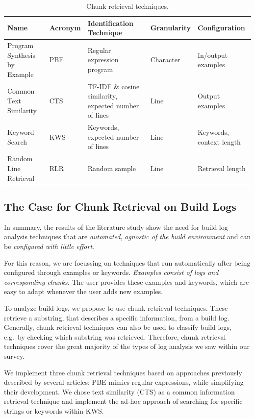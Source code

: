 \begin{table}[htb]
\centering
\caption{Chunk retrieval techniques.}
\begin{tabularx}{\textwidth}{@{}llXll@{}}
\toprule
Name			     & Acronym & Identification Technique
& Granularity & Configuration \\
\midrule
Program Synthesis by Example & PBE     & Regular expression program
& Character   & In/output examples	\\
Common Text Similarity	     & CTS     & TF-IDF \& cosine similarity,
expected number of lines & Line        & Output examples	   \\
Keyword Search		     & KWS     & Keywords, expected number of
lines			 & Line        & Keywords, context length  \\
Random Line Retrieval	     & RLR     & Random sample
& Line	      & Retrieval length	  \\
\bottomrule
\end{tabularx}
\label{tab:techniques}
\end{table}

\subsection{The Case for Chunk Retrieval on Build Logs}
In summary, the results of the literature study show the need for
build log
analysis techniques that are \emph{automated},
\emph{agnostic of the build environment}
and can be \emph{configured with little effort}.

For this reason, we are focussing on techniques that run automatically
after being configured through examples or keywords.
\emph{Examples consist of logs and corresponding chunks.}
The user provides these examples and keywords, which are easy to adapt whenever the user adds new examples.

To analyze build logs,
we propose to use chunk retrieval techniques.
These retrieve a substring,
that describes a specific information, from a build log.
Generally, chunk retrieval techniques
can also be used to classify build logs, e.g.\ by checking
which substring was retrieved.
Therefore, chunk retrieval techniques
cover the great majority of the types of log analysis we saw within
our survey.

We implement three chunk retrieval techniques based on approaches
previously described by several articles:
PBE mimics regular expressions, while simplifying
their development.
We chose text similarity (CTS) as a common information retrieval
technique and implement the ad-hoc approach of
searching for specific strings or keywords within KWS\@.

